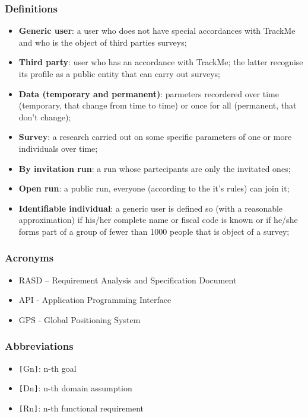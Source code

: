 \subsubsection{Definitions}
\begin{itemize}
\item \textbf{Generic user}: a user who does not have special accordances with TrackMe and who is the object of third parties surveys;
\item \textbf{Third party}: user who has an accordance with TrackMe; the latter recognise its profile as a public entity that can carry out surveys;
\item \textbf{Data (temporary and permanent)}: parmeters recordered over time (temporary, that change from time to time) or once for all (permanent, that don't change);
\item \textbf{Survey}: a research carried out on some specific parameters of one or more individuals over time;
\item \textbf{By invitation run}: a run whose partecipants are only the invitated ones;
\item \textbf{Open run}: a public run, everyone (according to the it's rules) can join it;
\item \textbf{Identifiable individual}: a generic user is defined so (with a reasonable approximation) if his/her complete name or fiscal code is known or if he/she forms part of a group of fewer than 1000 people that is object of a survey;
\end{itemize}
\subsubsection{Acronyms}
\begin{itemize}
\item RASD – Requirement Analysis and Specification Document
\item API - Application Programming Interface
\item GPS - Global Positioning System
\end{itemize}
\subsubsection{Abbreviations}
\begin{itemize}
\item \verb|[|Gn\verb|]|: n-th goal
\item \verb|[|Dn\verb|]|: n-th domain assumption
\item \verb|[|Rn\verb|]|: n-th functional requirement
\end{itemize}

